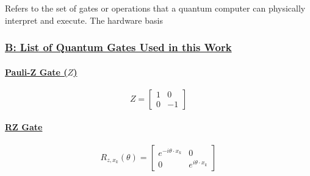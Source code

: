 \documentclass[
]{article}
\begin{document}
Refers to the set of gates or operations that a quantum computer can
physically interpret and execute. The hardware basis

\subsubsection*{\texorpdfstring{\underline{B: List of Quantum Gates Used in this Work}}{}}\label{section-15}

\paragraph*{\texorpdfstring{\underline{Pauli-Z Gate (\(Z\))}}{}}\label{section-16}

\[
  Z = \begin{bmatrix}
  1 & 0 \\
  0 & -1
  \end{bmatrix}
  \]

\paragraph*{\texorpdfstring{\underline{RZ Gate}}{}}\label{section-17}

\[
  R_{z,x_k}\left(\theta \right) = \begin{bmatrix}
  e^{-i\theta \cdot x_k} & 0 \\
  0 & e^{i\theta \cdot x_k} 
  \end{bmatrix}
  \]

\end{document}
